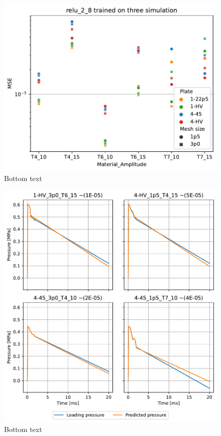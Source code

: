 \begin{figure}
    \centering
    \includegraphics[width=\textwidth]{Chapter/05_results/figures/para3_all.pdf}
    \caption{Bottom text}
    \label{fig:para3_all}
\end{figure}

\begin{figure}
    \centering
    \includegraphics[width=\textwidth]{Chapter/05_results/figures/para3_test.pdf}
    \caption{Bottom text}
    \label{fig:para3_test}
\end{figure}

